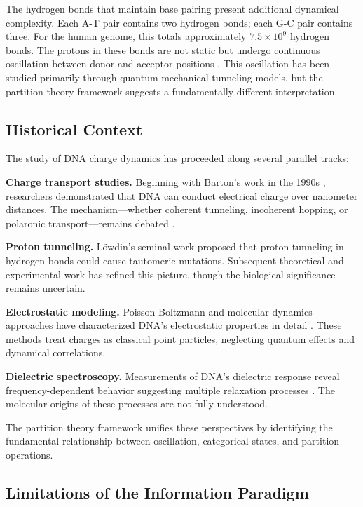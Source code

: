 \documentclass[twocolumn,10pt]{article}
\theoremstyle{remark}
\begin{document}
The hydrogen bonds that maintain base pairing present additional dynamical complexity. Each A-T pair contains two hydrogen bonds; each G-C pair contains three. For the human genome, this totals approximately $7.5 \times 10^9$ hydrogen bonds. The protons in these bonds are not static but undergo continuous oscillation between donor and acceptor positions \citep{lowdin1963proton}. This oscillation has been studied primarily through quantum mechanical tunneling models, but the partition theory framework suggests a fundamentally different interpretation.

\subsection{Historical Context}

The study of DNA charge dynamics has proceeded along several parallel tracks:

\textbf{Charge transport studies.} Beginning with Barton's work in the 1990s \citep{barton1999electron}, researchers demonstrated that DNA can conduct electrical charge over nanometer distances. The mechanism---whether coherent tunneling, incoherent hopping, or polaronic transport---remains debated \citep{genereux2010mechanisms}.

\textbf{Proton tunneling.} L\"owdin's seminal work \citep{lowdin1963proton} proposed that proton tunneling in hydrogen bonds could cause tautomeric mutations. Subsequent theoretical and experimental work has refined this picture, though the biological significance remains uncertain.

\textbf{Electrostatic modeling.} Poisson-Boltzmann and molecular dynamics approaches have characterized DNA's electrostatic properties in detail \citep{honig1995classical}. These methods treat charges as classical point particles, neglecting quantum effects and dynamical correlations.

\textbf{Dielectric spectroscopy.} Measurements of DNA's dielectric response reveal frequency-dependent behavior suggesting multiple relaxation processes \citep{takashima1984frequency}. The molecular origins of these processes are not fully understood.

The partition theory framework unifies these perspectives by identifying the fundamental relationship between oscillation, categorical states, and partition operations.

\subsection{Limitations of the Information Paradigm}
\end{document}
